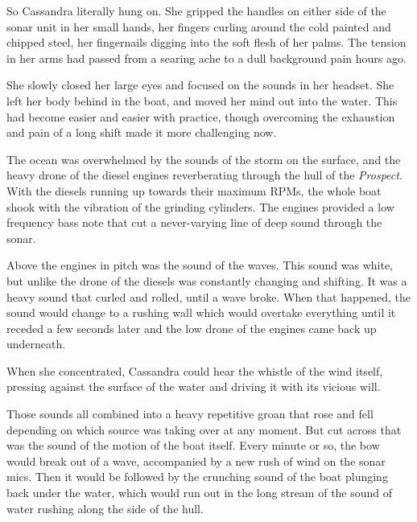 \documentclass[]{scrbook}
\begin{document}
So Cassandra literally hung on. She gripped the handles on either side
of the sonar unit in her small hands, her fingers curling around the
cold painted and chipped steel, her fingernails digging into the soft
flesh of her palms. The tension in her arms had passed from a searing
ache to a dull background pain hours ago.

She slowly closed her large eyes and focused on the sounds in her
headset. She left her body behind in the boat, and moved her mind out
into the water. This had become easier and easier with practice, though
overcoming the exhaustion and pain of a long shift made it more
challenging now.

The ocean was overwhelmed by the sounds of the storm on the surface, and
the heavy drone of the diesel engines reverberating through the hull of
the \emph{Prospect}. With the diesels running up towards their maximum
RPMs, the whole boat shook with the vibration of the grinding cylinders.
The engines provided a low frequency bass note that cut a never-varying
line of deep sound through the sonar.

Above the engines in pitch was the sound of the waves. This sound was
white, but unlike the drone of the diesels was constantly changing and
shifting. It was a heavy sound that curled and rolled, until a wave
broke. When that happened, the sound would change to a rushing wall
which would overtake everything until it receded a few seconds later and
the low drone of the engines came back up underneath.

When she concentrated, Cassandra could hear the whistle of the wind
itself, pressing against the surface of the water and driving it with
its vicious will.

Those sounds all combined into a heavy repetitive groan that rose and
fell depending on which source was taking over at any moment. But cut
across that was the sound of the motion of the boat itself. Every minute
or so, the bow would break out of a wave, accompanied by a new rush of
wind on the sonar mics. Then it would be followed by the crunching sound
of the boat plunging back under the water, which would run out in the
long stream of the sound of water rushing along the side of the hull.
\end{document}

